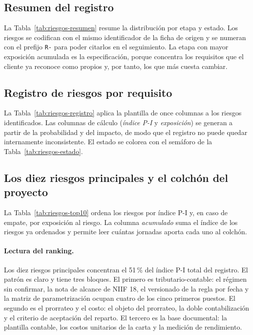 \subsection{Resumen del registro}
\label{subsec:riesgos-resumen}

La Tabla~\ref{tab:riesgos-resumen} resume la distribución por etapa y
estado. Los riesgos se codifican con el mismo identificador de la ficha de
origen y se numeran con el prefijo \texttt{R-} para poder citarlos en el
seguimiento. La etapa con mayor exposición acumulada es la especificación,
porque concentra los requisitos que el cliente ya reconoce como propios y,
por tanto, los que más cuesta cambiar.



\subsection{Registro de riesgos por requisito}
\label{subsec:riesgos-registro}

La Tabla~\ref{tab:riesgos-registro} aplica la plantilla de once columnas a
los \RiesgosTotal{} riesgos identificados. Las columnas de cálculo
(\emph{índice P-I} y \emph{exposición}) se generan a partir de la
probabilidad y del impacto, de modo que el registro no puede quedar
internamente inconsistente. El estado se colorea con el semáforo de la
Tabla~\ref{tab:riesgos-estado}.



\subsection{Los diez riesgos principales y el colchón del proyecto}
\label{subsec:riesgos-top10}

La Tabla~\ref{tab:riesgos-top10} ordena los riesgos por índice P-I y, en
caso de empate, por exposición al riesgo. La columna \emph{acumulado} suma
el índice de los riesgos ya ordenados y permite leer cuántas jornadas
aporta cada uno al colchón.



\paragraph{Lectura del ranking.} Los diez riesgos principales concentran el
51\,\% del índice P-I total del registro. El patrón es claro y tiene tres
bloques. El primero es tributario-contable: el régimen sin confirmar, la
nota de alcance de NIIF 18, el versionado de la regla por fecha y la matriz
de parametrización ocupan cuatro de los cinco primeros puestos. El segundo
es el prorrateo y el costo: el objeto del prorrateo, la doble
contabilización y el criterio de aceptación del reparto. El tercero es la
base documental: la plantilla contable, los costos unitarios de la carta y
la medición de rendimiento.

